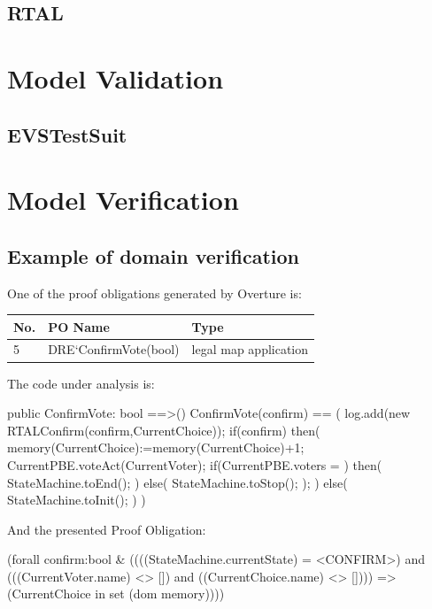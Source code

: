 \documentclass{article}
\begin{document}
\subsection{RTAL}

\section{Model Validation}
\subsection{EVSTestSuit}


\section{Model Verification}
\subsection{Example of domain verification}
One of the proof obligations generated by Overture is:

\begin{center}
    \begin{tabular}{ | l | l | p{7cm} |}
    \hline
   \textbf{No.}	& \textbf{PO Name} & \textbf{Type} \\ \hline
	5 & DRE`ConfirmVote(bool) & legal map application\\\hline
    \end{tabular}
\end{center}

The code under analysis is:

\begin{vdmpp}
public ConfirmVote: bool ==>()
	ConfirmVote(confirm) == (
			log.add(new RTALConfirm(confirm,CurrentChoice));
			if(confirm)
			then(
					memory(CurrentChoice):=memory(CurrentChoice)+1;
					CurrentPBE.voteAct(CurrentVoter);	
					if(CurrentPBE.voters = {})
					then(
						StateMachine.toEnd();
					)
					else(
						StateMachine.toStop();
					);
					)
			else(
					StateMachine.toInit();
					)
	)
\end{vdmpp}


And the presented Proof Obligation:

\begin{vdmpp}
(forall confirm:bool & ((((StateMachine.currentState) = <CONFIRM>) 
and (((CurrentVoter.name) <> []) and ((CurrentChoice.name) <> [])))
 => (CurrentChoice in set (dom memory))))
\end{vdmpp}
\end{document}
